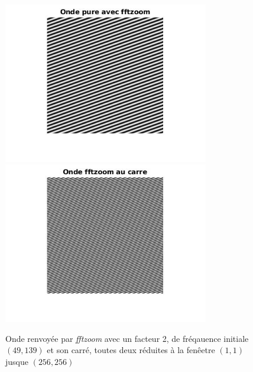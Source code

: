 \documentclass[12pt,a4paper,onecolumn]{article}
\begin{document}
\begin{figure}[H]
\begin{center}
	\includegraphics[width = 0.8\textwidth]{ex5_q2_onde.jpg}
	\includegraphics[width = 0.8\textwidth]{ex5_q2_square.jpg}
\end{center}
\caption{Onde renvoyée par \textit{fftzoom} avec un facteur 2, de fréqauence initiale $(49, 139)$ et son carré, toutes deux réduites à la fenêetre $(1, 1)$ jusque $(256, 256)$}
\label{ex5_q2}
\end{figure}
\end{document}
